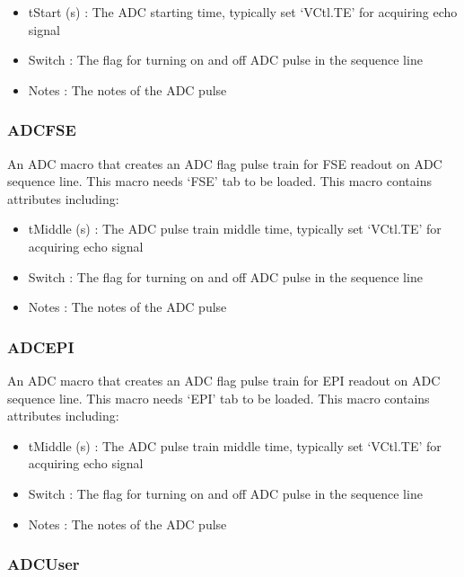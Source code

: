 \documentclass{book}%
\begin{document}
\begin{itemize}
	\item tStart (s) : The ADC starting time, typically set `VCtl.TE' for acquiring echo signal
	\item Switch : The flag for turning on and off ADC pulse in the sequence line
	\item Notes : The notes of the ADC pulse 
\end{itemize}


\subsubsection{ADCFSE}

An ADC macro that creates an ADC flag pulse train for FSE readout on ADC sequence line. This macro needs `FSE' tab to be loaded. This macro contains attributes including:

\begin{itemize}
	\item tMiddle (s) : The ADC pulse train middle time, typically set `VCtl.TE' for acquiring echo signal
	\item Switch : The flag for turning on and off ADC pulse in the sequence line
	\item Notes : The notes of the ADC pulse 
\end{itemize}

\subsubsection{ADCEPI}

An ADC macro that creates an ADC flag pulse train for EPI readout on ADC sequence line. This macro needs `EPI' tab to be loaded. This macro contains attributes including:

\begin{itemize}
	\item tMiddle (s) : The ADC pulse train middle time, typically set `VCtl.TE' for acquiring echo signal
	\item Switch : The flag for turning on and off ADC pulse in the sequence line
	\item Notes : The notes of the ADC pulse 
\end{itemize}

\subsubsection{ADCUser}
\end{document}

